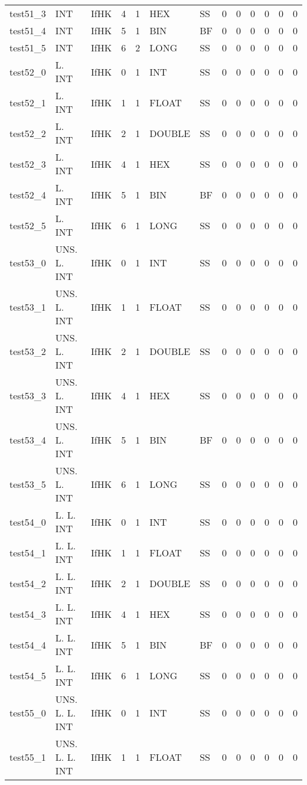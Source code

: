\begin{longtable}{|l|l|l|p{0.5cm}|p{0.5cm}|l|p{0.5cm}|p{0.5cm}|p{0.5cm}|l|l|p{0.5cm}|l|}
test51\_3 & INT & IfHK & 4 & 1 & HEX & SS & 0 & 0 & 0 & 0 & 0 & 0 \\
test51\_4 & INT & IfHK & 5 & 1 & BIN & BF & 0 & 0 & 0 & 0 & 0 & 0 \\
test51\_5 & INT & IfHK & 6 & 2 & LONG & SS & 0 & 0 & 0 & 0 & 0 & 0 \\
test52\_0 & L. INT & IfHK & 0 & 1 & INT & SS & 0 & 0 & 0 & 0 & 0 & 0 \\
test52\_1 & L. INT & IfHK & 1 & 1 & FLOAT & SS & 0 & 0 & 0 & 0 & 0 & 0 \\
test52\_2 & L. INT & IfHK & 2 & 1 & DOUBLE & SS & 0 & 0 & 0 & 0 & 0 & 0 \\
test52\_3 & L. INT & IfHK & 4 & 1 & HEX & SS & 0 & 0 & 0 & 0 & 0 & 0 \\
test52\_4 & L. INT & IfHK & 5 & 1 & BIN & BF & 0 & 0 & 0 & 0 & 0 & 0 \\
test52\_5 & L. INT & IfHK & 6 & 1 & LONG & SS & 0 & 0 & 0 & 0 & 0 & 0 \\
test53\_0 & UNS. L. INT & IfHK & 0 & 1 & INT & SS & 0 & 0 & 0 & 0 & 0 & 0 \\
test53\_1 & UNS. L. INT & IfHK & 1 & 1 & FLOAT & SS & 0 & 0 & 0 & 0 & 0 & 0 \\
test53\_2 & UNS. L. INT & IfHK & 2 & 1 & DOUBLE & SS & 0 & 0 & 0 & 0 & 0 & 0 \\
test53\_3 & UNS. L. INT & IfHK & 4 & 1 & HEX & SS & 0 & 0 & 0 & 0 & 0 & 0 \\
test53\_4 & UNS. L. INT & IfHK & 5 & 1 & BIN & BF & 0 & 0 & 0 & 0 & 0 & 0 \\
test53\_5 & UNS. L. INT & IfHK & 6 & 1 & LONG & SS & 0 & 0 & 0 & 0 & 0 & 0 \\
test54\_0 & L. L. INT & IfHK & 0 & 1 & INT & SS & 0 & 0 & 0 & 0 & 0 & 0 \\
test54\_1 & L. L. INT & IfHK & 1 & 1 & FLOAT & SS & 0 & 0 & 0 & 0 & 0 & 0 \\
test54\_2 & L. L. INT & IfHK & 2 & 1 & DOUBLE & SS & 0 & 0 & 0 & 0 & 0 & 0 \\
test54\_3 & L. L. INT & IfHK & 4 & 1 & HEX & SS & 0 & 0 & 0 & 0 & 0 & 0 \\
test54\_4 & L. L. INT & IfHK & 5 & 1 & BIN & BF & 0 & 0 & 0 & 0 & 0 & 0 \\
test54\_5 & L. L. INT & IfHK & 6 & 1 & LONG & SS & 0 & 0 & 0 & 0 & 0 & 0 \\
test55\_0 & UNS. L. L. INT & IfHK & 0 & 1 & INT & SS & 0 & 0 & 0 & 0 & 0 & 0 \\
test55\_1 & UNS. L. L. INT & IfHK & 1 & 1 & FLOAT & SS & 0 & 0 & 0 & 0 & 0 & 0 \\

\end{longtable}

